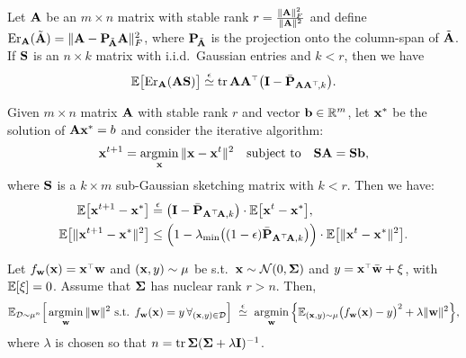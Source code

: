 \documentclass[11pt]{article}
\begin{document}
\begin{corollary}
  Let $\A$ be an $m\times n$ matrix with stable rank
  $r=\frac{\|\A\|_F^2}{\|\A\|^2}$ and define
  $\Er_\A(\tilde\A)=\|\A-\P_{\!\tilde\A}\A\|_F^2$, where $\P_{\!\tilde\A}$
  is the projection onto the column-span of $\tilde\A$. If $\S$ is an
  $n\times k$ matrix with i.i.d.~Gaussian entries and $k<r$, then we have
  \begin{align*}
    \E\big[\Er_\A(\A\S)\big]  \overset{\epsilon}{\simeq}
    \tr\,\A\A^\top\big(\I-\bar\P_{\A\A^\top\!,k}\big).
  \end{align*}
\end{corollary}
\begin{corollary}
  Given $m\times n$ matrix $\A$ with stable rank $r$ and vector
  $\b\in\R^m$, let $\x^*$ be the solution of $\A\x^*=b$ and consider
  the iterative algorithm:
  \begin{align*}
    \x^{t+1} = \argmin_\x\|\x-\x^t\|^2\quad\text{subject to}\quad\S\A=\S\b,
  \end{align*}
  where $\S$ is a $k\times m$ sub-Gaussian sketching matrix with
  $k<r$. Then we have:
  \begin{align*}
    \E\big[\x^{t+1}-\x^*\big] &\overset{\epsilon}{=}
    \big(\I - \bar\P_{\A^\top\!\A,k}\big)\cdot\E\big[\x^t-\x^*\big],\\
    \E\big[\|\x^{t+1}-\x^*\|^2\big]&\leq
\Big(1-\lambda_{\min}\big((1-\epsilon)\bar\P_{\A^\top\!\A,k}\big)\Big)\cdot
    \E\big[\|\x^t-\x^*\|^2\big].
  \end{align*}
\end{corollary}
\begin{corollary}
Let $f_\w(\x)=\x^\top\w$ and $(\x,y)\sim\mu$
  be s.t.~$\x\sim\Nc(0,\Sigmab)$ and $y=\x^\top \bar \w+\xi$,
  with $\E[\xi]=0$. Assume that $\Sigmab$ has nuclear rank
  $r>n$. Then,
  \begin{align*}
    \E_{\Dc\sim\mu^n} \Big[\argmin_{\w}\|\w\|^2\text{ s.t. }f_\w(\x)=y\,\forall_{(\x,y)\in \Dc}\Big]
   \ \overset{\epsilon}{\simeq}\
    \argmin_{\w}\Big\{\E_{(\x,y)\sim\mu}\big(f_\w(\x)-y\big)^2 + \lambda\|\w\|^2\Big\},
  \end{align*}
  where $\lambda$ is chosen so that $n=\tr\,\Sigmab(\Sigmab+\lambda\I)^{-1}$.
\end{corollary}
\end{document}
